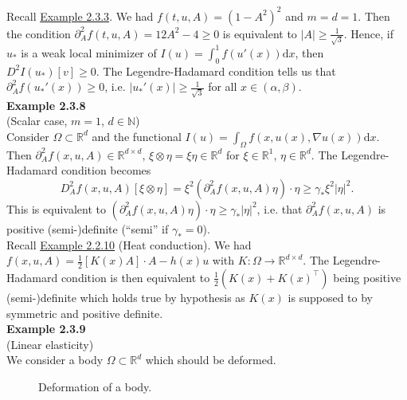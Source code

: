 Recall \hyperlink{example_2_3_3}{Example 2.3.3}. We had $f(t,u,A)=(1-A^2)^2$ and $m=d=1$. Then the condition $\partial_A^2f(t,u,A)=12A^2-4\geq0$ is equivalent to $\lvert A\rvert\geq\frac{1}{\sqrt{3}}$. Hence, if $u_*$ is a weak local minimizer of $I(u)=\int_0^1{f(u'(x))\mathrm{d}x}$, then $D^2I(u_*)[v]\geq0$. The Legendre-Hadamard condition tells us that $\partial_A^2f(u_*'(x))\geq0$, i.e. $\lvert u_*'(x)\rvert\geq\frac{1}{\sqrt{3}}$ for all $x\in(\alpha,\beta)$.\\[11pt]

\textbf{Example 2.3.8}\\
(Scalar case, $m=1$, $d\in\mathbb{N}$)\\
Consider $\Omega\subset\mathbb{R}^d$ and the functional $I(u)=\int_\Omega{f(x,u(x),\nabla u(x))\mathrm{d}x}$. Then $\partial_A^2f(x,u,A)\in\mathbb{R}^{d\times d}$, $\xi\otimes\eta=\xi\eta\in\mathbb{R}^d$ for $\xi\in\mathbb{R}^1$, $\eta\in\mathbb{R}^d$. The Legendre-Hadamard condition becomes
\[D_A^2f(x,u,A)[\xi\otimes\eta]=\xi^2(\partial_A^2f(x,u,A)\eta)\cdot\eta\geq\gamma_*\xi^2\lvert\eta\rvert^2.\]
This is equivalent to $(\partial_A^2f(x,u,A)\eta)\cdot\eta\geq\gamma_*\lvert\eta\rvert^2$, i.e. that $\partial_A^2f(x,u,A)$ is positive (semi-)definite (``semi'' if $\gamma_*=0$).\\[11pt]

Recall \hyperlink{example_2_2_10}{Example 2.2.10} (Heat conduction). We had $f(x,u,A)=\frac{1}{2}[K(x)A]\cdot A-h(x)u$ with $K:\Omega\longrightarrow\mathbb{R}^{d\times d}$. The Legendre-Hadamard condition is then equivalent to $\frac{1}{2}(K(x)+K(x)^\top)$ being positive (semi-)definite which holds true by hypothesis as $K(x)$ is supposed to by symmetric and positive definite.\\[11pt]

\textbf{Example 2.3.9}\\
(Linear elasticity)\\
We consider a body $\Omega\subset\mathbb{R}^d$ which should be deformed.

\begin{figure}[ht]
	\centering
	\caption{Deformation of a body.}
\end{figure}

